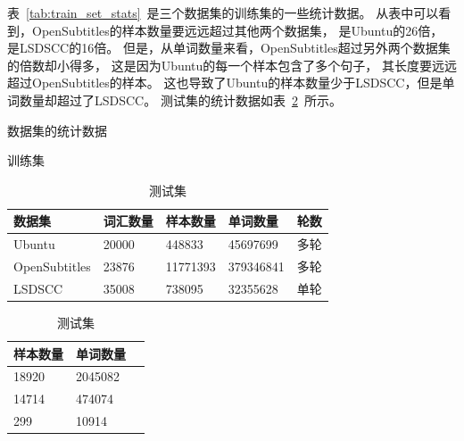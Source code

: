 表~\ref{tab:train_set_stats}~是三个数据集的训练集的一些统计数据。
从表中可以看到，OpenSubtitles的样本数量要远远超过其他两个数据集，
是Ubuntu的26倍， 是LSDSCC的16倍。
但是，从单词数量来看，OpenSubtitles超过另外两个数据集的倍数却小得多，
这是因为Ubuntu的每一个样本包含了多个句子，
其长度要远远超过OpenSubtitles的样本。
这也导致了Ubuntu的样本数量少于LSDSCC，但是单词数量却超过了LSDSCC。
测试集的统计数据如表~\ref{tab:test_set_stats}~所示。
\begin{table}[H]
    \centering
    \caption{数据集的统计数据}
    \begin{subtable}{0.6\linewidth}
        \centering
        \caption{训练集}
        \label{tab:train_set_stats}
        \begin{tabular}{lllll}
            \toprule
            \midrule
            数据集 & 词汇数量 & 样本数量 & 单词数量 & 轮数 \\
            \midrule
            Ubuntu & 20000 & 448833 & 45697699 & 多轮 \\
            OpenSubtitles & 23876 & 11771393 & 379346841 & 多轮 \\
            LSDSCC & 35008 & 738095 & 32355628 & 单轮 \\
            \bottomrule
        \end{tabular}
    \end{subtable}%
    \begin{subtable}{0.3\linewidth}
        \centering
        \caption{测试集}
        \label{tab:test_set_stats}
        \begin{tabular}{lll}
            \toprule
            \midrule
            样本数量 & 单词数量 \\
            \midrule
            18920 & 2045082   \\
            14714 & 474074 \\
            299 & 10914 \\
            \bottomrule
        \end{tabular}
    \end{subtable}
\end{table}

